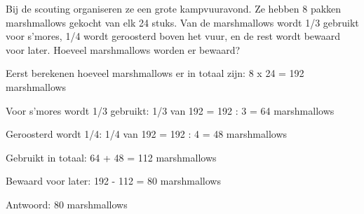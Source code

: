 \begin{opgave}
Bij de scouting organiseren ze een grote kampvuuravond. Ze hebben 8 pakken 
marshmallows gekocht van elk 24 stuks. Van de marshmallows wordt 1/3 gebruikt 
voor s'mores, 1/4 wordt geroosterd boven het vuur, en de rest wordt bewaard 
voor later. Hoeveel marshmallows worden er bewaard?
\end{opgave}

\begin{oplossing}
Eerst berekenen hoeveel marshmallows er in totaal zijn:
8 x 24 = 192 marshmallows

Voor s'mores wordt 1/3 gebruikt:
1/3 van 192 = 192 : 3 = 64 marshmallows

Geroosterd wordt 1/4:
1/4 van 192 = 192 : 4 = 48 marshmallows

Gebruikt in totaal:
64 + 48 = 112 marshmallows

Bewaard voor later:
192 - 112 = 80 marshmallows

Antwoord: 80 marshmallows
\end{oplossing}